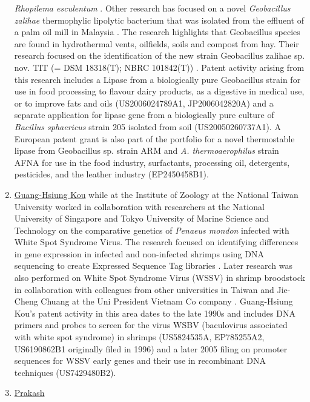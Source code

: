 \documentclass[]{book}
\theoremstyle{definition}
\theoremstyle{definition}
\theoremstyle{definition}
\theoremstyle{remark}
\begin{document}
\begin{enumerate}
  \emph{Rhopilema esculentum} \citep{Khong_2016}. Other research has
  focused on a novel \emph{Geobacillus zalihae} thermophylic lipolytic
  bacterium that was isolated from the effluent of a palm oil mill in
  Malaysia \citep{Rahman_2007}. The research highlights that Geobacillus
  species are found in hydrothermal vents, oilfields, soils and compost
  from hay. Their research focused on the identification of the new
  strain Geobacillus zalihae sp. nov. TIT (= DSM 18318(T); NBRC
  101842(T)) \citep{Khong_2016}. Patent activity arising from this
  research includes a Lipase from a biologically pure Geobacillus strain
  for use in food processing to flavour dairy products, as a digestive
  in medical use, or to improve fats and oils (US2006024789A1,
  JP2006042820A) and a separate application for lipase gene from a
  biologically pure culture of \emph{Bacillus sphaericus} strain 205
  isolated from soil (US20050260737A1). A European patent grant is also
  part of the portfolio for a novel thermostable lipase from Geobacillus
  sp. strain ARM and \emph{A. thermoaerophilus} strain AFNA for use in
  the food industry, surfactants, processing oil, detergents,
  pesticides, and the leather industry (EP2450458B1).
\item
  \href{https://www.researchgate.net/scientific-contributions/39872049_Guang-Hsiung_Kou}{Guang-Hsiung
  Kou} while at the Institute of Zoology at the National Taiwan
  University worked in collaboration with researchers at the National
  University of Singapore and Tokyo University of Marine Science and
  Technology on the comparative genetics of \emph{Penaeus mondon}
  infected with White Spot Syndrome Virus. The research focused on
  identifying differences in gene expression in infected and
  non-infected shrimps using DNA sequencing to create Expressed Sequence
  Tag libraries \citep{Leu_2007}. Later research was also performed on
  White Spot Syndrome Virus (WSSV) in shrimp broodstock in collaboration
  with colleagues from other universities in Taiwan and Jie-Cheng Chuang
  at the Uni President Vietnam Co company \citep{Chang_2012}.
  Guang-Hsiung Kou's patent activity in this area dates to the late
  1990s and includes DNA primers and probes to screen for the virus WSBV
  (baculovirus associated with white spot syndrome) in shrimps
  (US5824535A, EP785255A2, US6190862B1 originally filed in 1996) and a
  later 2005 filing on promoter sequences for WSSV early genes and their
  use in recombinant DNA techniques (US7429480B2).
\item
  \href{https://en.wikipedia.org/wiki/Prakash_Kumar_Pallathadka}{Prakash
}
\end{enumerate}
\end{document}
